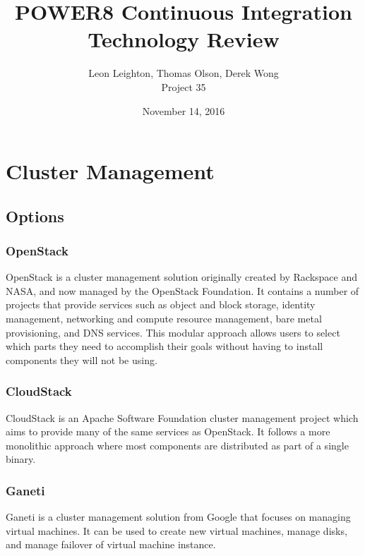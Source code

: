 \documentclass[10pt,letterpaper,onecolumn,journal]{IEEEtran}
\begin{document}
\begin{titlepage}
  \title{POWER8 Continuous Integration Technology Review}
  \author{Leon Leighton, Thomas Olson, Derek Wong\\Project 35}
  \date{November 14, 2016}
  \maketitle
  \vspace{4cm}
  \begin{abstract}
  \noindent
  \end{abstract}
\end{titlepage}

\tableofcontents
\clearpage

\section{Cluster Management}
\subsection{Options}
\subsubsection{OpenStack}
OpenStack is a cluster management solution originally created by Rackspace and NASA, and now managed by the OpenStack Foundation.
It contains a number of projects that provide services such as object and block storage, identity management, networking and compute resource management, bare metal provisioning, and DNS services.
This modular approach allows users to select which parts they need to accomplish their goals without having to install components they will not be using.
\subsubsection{CloudStack}
CloudStack is an Apache Software Foundation cluster management project which aims to provide many of the same services as OpenStack.
It follows a more monolithic approach where most components are distributed as part of a single binary.
\subsubsection{Ganeti}
Ganeti is a cluster management solution from Google that focuses on managing virtual machines.
It can be used to create new virtual machines, manage disks, and manage failover of virtual machine instance.
\end{document}
